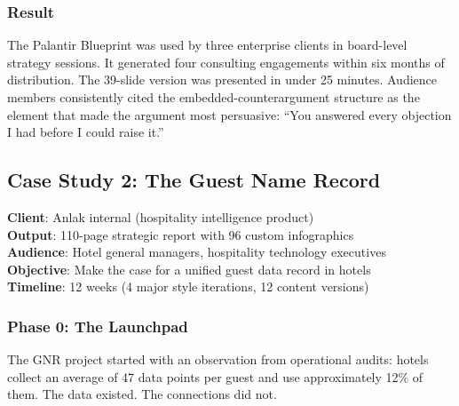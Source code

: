 \subsubsection{Result}

The Palantir Blueprint was used by three enterprise clients in board-level strategy sessions. It generated four consulting engagements within six months of distribution. The 39-slide version was presented in under 25 minutes. Audience members consistently cited the embedded-counterargument structure as the element that made the argument most persuasive: ``You answered every objection I had before I could raise it.''

\subsection{Case Study 2: The Guest Name Record}

\begin{casebox}
\textbf{Client}: Anlak internal (hospitality intelligence product)\\
\textbf{Output}: 110-page strategic report with 96 custom infographics\\
\textbf{Audience}: Hotel general managers, hospitality technology executives\\
\textbf{Objective}: Make the case for a unified guest data record in hotels\\
\textbf{Timeline}: 12 weeks (4 major style iterations, 12 content versions)
\end{casebox}

\subsubsection{Phase 0: The Launchpad}

The GNR project started with an observation from operational audits: hotels collect an average of 47 data points per guest and use approximately 12\% of them. The data existed. The connections did not.

